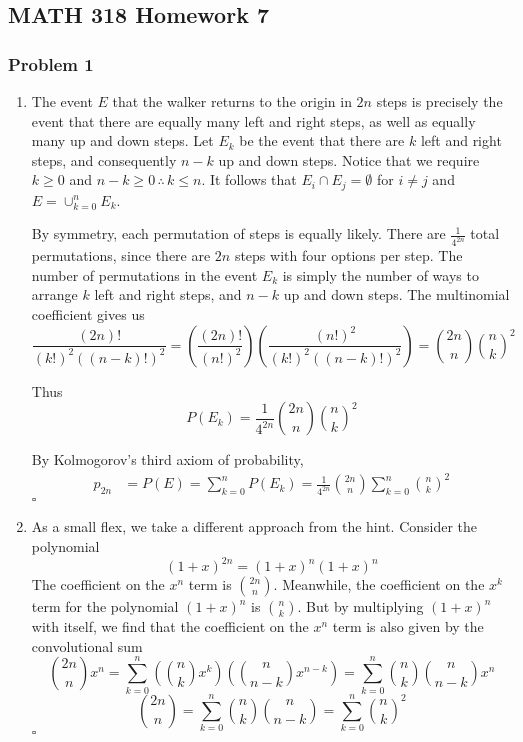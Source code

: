 \documentclass[letterpaper,12pt]{article}
\newcommand{\hwnum}{7} %
\renewcommand*{\qed}{\hfill\ensuremath{\square}}
\begin{document}
\begin{flushleft}

    \subsection*{MATH 318 Homework \hwnum}

    \subsubsection*{Problem 1}
    \begin{enumerate}[label=(\alph*)]

        \item
        The event $E$ that the walker returns to the origin in $2n$ steps is precisely the event that there are equally many left and right steps, as well as equally many up and down steps. Let $E_k$ be the event that there are $k$ left and right steps, and consequently $n - k$ up and down steps. Notice that we require $k \geq 0$ and $n - k \geq 0 \, \therefore \, k \leq n$. It follows that $E_i \cap E_j = \emptyset$ for $i \neq j$ and $E = \cup_{k=0}^n E_k$.

        By symmetry, each permutation of steps is equally likely. There are $\frac{1}{4^{2n}}$ total permutations, since there are $2n$ steps with four options per step. The number of permutations in the event $E_k$ is simply the number of ways to arrange $k$ left and right steps, and $n - k$ up and down steps. The multinomial coefficient gives us
        $$\frac{(2n)!}{(k!)^2((n-k)!)^2} = \left(\frac{(2n)!}{(n!)^2}\right)\left(\frac{(n!)^2}{(k!)^2((n-k)!)^2}\right) = \binom{2n}{n}\binom{n}{k}^2$$
        
        Thus
        $$P(E_k) = \frac{1}{4^{2n}}\binom{2n}{n}\binom{n}{k}^2$$

        By Kolmogorov's third axiom of probability,
        \begin{align*}
            p_{2n} &= P(E) = \sum_{k=0}^n P(E_k) = \frac{1}{4^{2n}}\binom{2n}{n} \sum_{k=0}^n\binom{n}{k}^2
        \end{align*}
        \qed
        
        \item
        As a small flex, we take a different approach from the hint. Consider the polynomial
        $$(1 + x)^{2n} = (1 + x)^n (1 + x)^n$$
        The coefficient on the $x^n$ term is $\binom{2n}{n}$. Meanwhile, the coefficient on the $x^k$ term for the polynomial $(1 + x)^n$ is $\binom{n}{k}$. But by multiplying $(1 + x)^n$ with itself, we find that the coefficient on the $x^n$ term is also given by the convolutional sum
        $$\binom{2n}{n} x^n = \sum_{k=0}^n \left(\binom{n}{k} x^k\right)\left(\binom{n}{n-k} x^{n-k}\right) = \sum_{k=0}^n \binom{n}{k}\binom{n}{n-k}x^n$$
        $$\binom{2n}{n} = \sum_{k=0}^n \binom{n}{k}\binom{n}{n-k} = \sum_{k=0}^n \binom{n}{k}^2$$
        \qed


\end{enumerate}
\end{flushleft}
\end{document}
